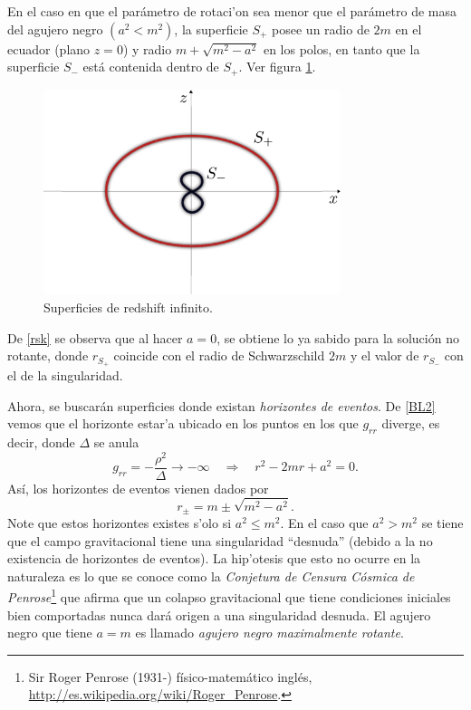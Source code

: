 En el caso en que el par\'ametro de rotaci'on sea menor que el par\'ametro de masa del agujero negro $(a^2<m^2)$, la superficie $S_{+}$ posee un radio de $2m$ en el ecuador (plano $z=0$) y radio $m+\sqrt{m^2-a^2}$ en los polos, en tanto que la superficie $S_{-}$ est\'a contenida dentro de $S_{+}$. Ver figura \ref{fig:surface1}.
\begin{figure}[H]
 \centering
\includegraphics[height=6cm,angle=0]{fig/fig-surface1.pdf}
\caption{Superficies de redshift infinito.}
\label{fig:surface1}
\end{figure}
De \eqref{rsk} se observa que al hacer $a=0$, se obtiene lo ya sabido para la soluci\'on no rotante, donde $r_{S_{+}}$ coincide con el radio de
Schwarzschild $2m$ y el valor de $r_{S_{-}}$ con el de la singularidad.

Ahora, se buscar\'an superficies donde existan \textit{horizontes de eventos}. De \eqref{BL2} vemos que el horizonte estar'a ubicado en los puntos en los que $g_{rr}$ diverge, es decir, donde $\Delta$ se anula
\begin{equation}\label{grr}
g_{rr}=-\frac{\rho^2}{\Delta}\rightarrow -\infty \quad\Rightarrow\quad r^2-2mr+a^2=0.
\end{equation}
As\'i, los horizontes de eventos vienen dados por
\begin{equation}\label{horizontes}
\boxed{r_{\pm}=m\pm\sqrt{m^2-a^2}.}
\end{equation}
Note que estos horizontes existes s'olo si $a^2\leqslant m^2$. En el caso que $a^2>m^2$ se tiene que el campo gravitacional tiene una singularidad ``desnuda'' (debido a la no existencia de horizontes de eventos). La hip'otesis que esto no ocurre en la naturaleza es lo que se conoce como la \textit{Conjetura de Censura C\'osmica de Penrose}\footnote{Sir Roger Penrose (1931-) f\'isico-matem\'atico ingl\'es, \url{http://es.wikipedia.org/wiki/Roger_Penrose}.} que afirma que un colapso gravitacional que tiene condiciones iniciales bien comportadas nunca dar\'a origen a una singularidad desnuda. El agujero negro que tiene $a=m$ es llamado \textit{agujero negro maximalmente rotante}.\\

